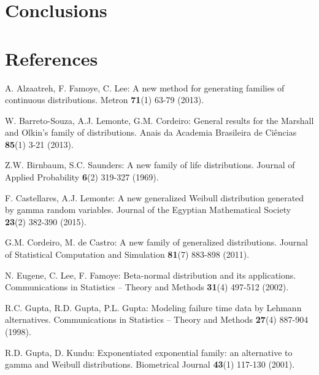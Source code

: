 \documentclass[12pt,a4paper]{article} %
\begin{document}
\section{Conclusions}\label{conclusions}




\section*{References}

\begin{description}

\item
A. Alzaatreh, F. Famoye, C. Lee:
A new method for generating families of continuous distributions.
Metron {\bf 71}(1) 63-79 (2013).

\item
W. Barreto-Souza, A.J. Lemonte, G.M. Cordeiro:
General results for the Marshall and Olkin's family of distributions.
Anais da Academia Brasileira de Ci\^{e}ncias {\bf 85}(1) 3-21 (2013).

\item
Z.W. Birnbaum, S.C. Saunders:
A new family of life distributions.
Journal of Applied Probability {\bf 6}(2) 319-327 (1969).

\item
F. Castellares, A.J. Lemonte:
A new generalized Weibull distribution gene\-rated by gamma random variables.
Journal of the Egyptian Mathematical Society {\bf 23}(2) 382-390 (2015).

\item
G.M. Cordeiro, M. de Castro:
A new family of generalized distributions.
Journal of Statistical Computation and Simulation {\bf 81}(7) 883-898 (2011).

\item
N. Eugene, C. Lee, F. Famoye:
Beta-normal distribution and its applications.
Communications in Statistics -- Theory and Methods {\bf 31}(4) 497-512 (2002).

\item
R.C. Gupta, R.D. Gupta, P.L. Gupta:
Modeling failure time data by Lehmann alternatives.
Communications in Statistics -- Theory and Methods {\bf 27}(4) 887-904 (1998).

\item
R.D. Gupta, D. Kundu:
Exponentiated exponential family: an alternative to gamma and Weibull distributions.
Biometrical Journal {\bf 43}(1) 117-130 (2001).



\end{description}
\end{document}
